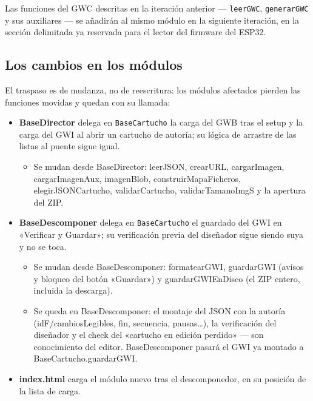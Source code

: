 Las funciones del GWC descritas en la iteración anterior —
\texttt{leerGWC}, \texttt{generarGWC} y sus auxiliares — se
añadirán al mismo módulo en la siguiente iteración, en la sección delimitada ya reservada para el lector del firmware del ESP32.

\subsection{Los cambios en los módulos}
\label{sec:F5I4Cambios}

El traspaso es de mudanza, no de reescritura: los módulos
afectados pierden las funciones movidas y quedan con su llamada:

\begin{itemize}
	\item \textbf{BaseDirector} delega en \texttt{BaseCartucho} la
	carga del GWB tras el setup y la carga del GWI al abrir un
	cartucho de autoría; su lógica de arrastre de las listas al
	puente sigue igual. 
	
	\begin{itemize}
		\item Se mudan desde BaseDirector: leerJSON, crearURL, cargarImagen, cargarImagenAux, imagenBlob, construirMapaFicheros, elegirJSONCartucho, validarCartucho, validarTamanoImgS y la apertura del ZIP.
	\end{itemize}
	
	\item \textbf{BaseDescomponer} delega en \texttt{BaseCartucho}
	el guardado del GWI en «Verificar y Guardar»; su verificación
	previa del diseñador sigue siendo suya y no se toca.
		\begin{itemize}
			\item Se mudan desde BaseDescomponer: formatearGWI, guardarGWI (avisos y bloqueo del botón «Guardar») y guardarGWIEnDisco (el ZIP entero, incluida la descarga).
			
			\item Se queda en BaseDescomponer: el montaje del JSON con la autoría (idF/cambiosLegibles, fin, secuencia, pausas…), la verificación del diseñador y el check del «cartucho en edición perdido» — son conocimiento del editor. BaseDescomponer pasará el GWI ya montado a BaseCartucho.guardarGWI.		
		\end{itemize}
	
	\item \textbf{index.html} carga el módulo nuevo tras el
	descomponedor, en su posición de la lista de carga.
\end{itemize}

